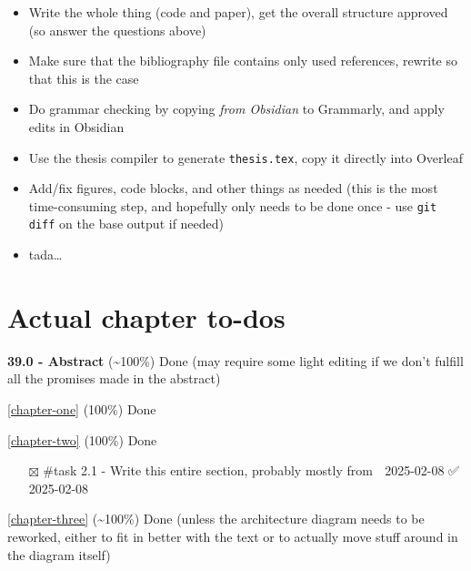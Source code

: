 \begin{itemize}
\tightlist
\item
  Write the whole thing (code and paper), get the overall structure
  approved (so answer the questions above)
\item
  Make sure that the bibliography file contains only used references,
  rewrite so that this is the case
\item
  Do grammar checking by copying \emph{from Obsidian} to Grammarly, and
  apply edits in Obsidian
\item
  Use the thesis compiler to generate
  \passthrough{\lstinline!thesis.tex!}, copy it directly into Overleaf
\item
  Add/fix figures, code blocks, and other things as needed (this is the
  most time-consuming step, and hopefully only needs to be done once -
  use \passthrough{\lstinline!git diff!} on the base output if needed)
\item
  tada\ldots{}
\end{itemize}

\section{Actual chapter to-dos}\label{actual-chapter-to-dos}

\textbf{39.0 - Abstract} (\textasciitilde100\%) Done (may require some
light editing if we don't fulfill all the promises made in the abstract)

\autoref{chapter-one} (100\%) Done

\autoref{chapter-two} (100\%) Done

\begin{itemize}
\tightlist
\item[$\boxtimes$]
  \#task 2.1 - Write this entire section, probably mostly from
  \cite{grajedaAvailabilityDatasetsDigital2017} 📅 2025-02-08 ✅
  2025-02-08
\end{itemize}

\autoref{chapter-three} (\textasciitilde100\%) Done
(unless the architecture diagram needs to be reworked, either to fit in
better with the text or to actually move stuff around in the diagram
itself)

